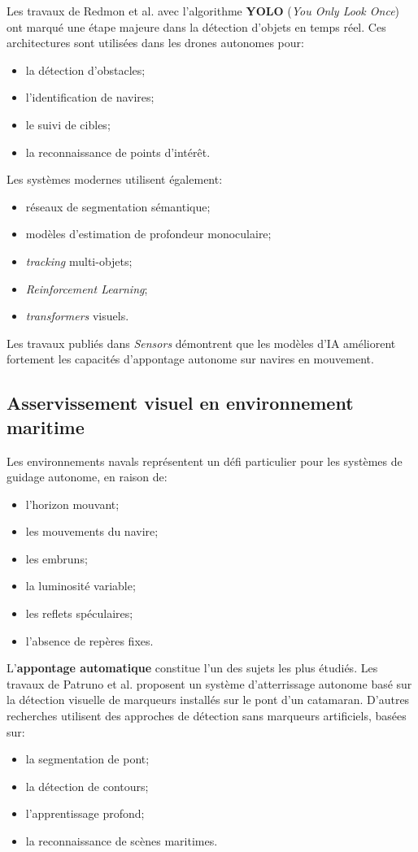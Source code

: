 \documentclass[12pt, a4paper, twoside, openright]{report}
\begin{document}
Les travaux de Redmon et al. avec l’algorithme \textbf{YOLO} (\textit{You Only Look Once}) \cite{redmon2016you} ont marqué une étape majeure dans la détection d’objets en temps réel. Ces architectures sont utilisées dans les drones autonomes pour:
\begin{itemize}
    \item la détection d’obstacles;
    \item l’identification de navires;
    \item le suivi de cibles;
    \item la reconnaissance de points d’intérêt.
\end{itemize}

Les systèmes modernes utilisent également:
\begin{itemize}
    \item réseaux de segmentation sémantique;
    \item modèles d’estimation de profondeur monoculaire;
    \item \textit{tracking} multi-objets;
    \item \textit{Reinforcement Learning};
    \item \textit{transformers} visuels.
\end{itemize}

Les travaux publiés dans \textit{Sensors} \cite{sensors2022drones} démontrent que les modèles d’IA améliorent fortement les capacités d’appontage autonome sur navires en mouvement.

\subsection{Asservissement visuel en environnement maritime}
Les environnements navals représentent un défi particulier pour les systèmes de guidage autonome, en raison de:
\begin{itemize}
    \item l’horizon mouvant;
    \item les mouvements du navire;
    \item les embruns;
    \item la luminosité variable;
    \item les reflets spéculaires;
    \item l’absence de repères fixes.
\end{itemize}

L’\textbf{appontage automatique} constitue l’un des sujets les plus étudiés. Les travaux de Patruno et al.\cite{patruno2021visual} proposent un système d’atterrissage autonome basé sur la détection visuelle de marqueurs installés sur le pont d’un catamaran. D’autres recherches utilisent des approches de détection sans marqueurs artificiels, basées sur:
\begin{itemize}
    \item la segmentation de pont;
    \item la détection de contours;
    \item l’apprentissage profond;
    \item la reconnaissance de scènes maritimes.
\end{itemize}
\end{document}
